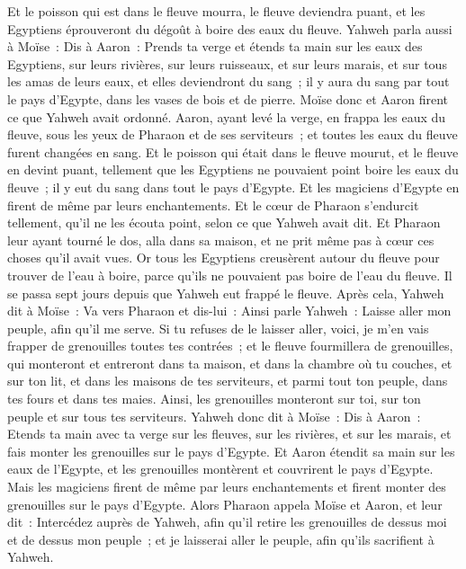 \begin{multicols}{2}
Et le poisson qui est dans le fleuve mourra, le fleuve deviendra puant, et les Egyptiens éprouveront du dégoût à boire des eaux du fleuve.
Yahweh parla aussi à Moïse~: Dis à Aaron~: Prends ta verge et étends ta main sur les eaux des Egyptiens, sur leurs rivières, sur leurs ruisseaux, et sur leurs marais, et sur tous les amas de leurs eaux, et elles deviendront du sang~; il y aura du sang par tout le pays d'Egypte, dans les vases de bois et de pierre.
Moïse donc et Aaron firent ce que Yahweh avait ordonné. Aaron, ayant levé la verge, en frappa les eaux du fleuve, sous les yeux de Pharaon et de ses serviteurs~; et toutes les eaux du fleuve furent changées en sang.
Et le poisson qui était dans le fleuve mourut, et le fleuve en devint puant, tellement que les Egyptiens ne pouvaient point boire les eaux du fleuve~; il y eut du sang dans tout le pays d'Egypte.
Et les magiciens d'Egypte en firent de même par leurs enchantements. Et le cœur de Pharaon s'endurcit tellement, qu'il ne les écouta point, selon ce que Yahweh avait dit.
Et Pharaon leur ayant tourné le dos, alla dans sa maison, et ne prit même pas à cœur ces choses qu'il avait vues.
Or tous les Egyptiens creusèrent autour du fleuve pour trouver de l'eau à boire, parce qu'ils ne pouvaient pas boire de l'eau du fleuve.
Il se passa sept jours depuis que Yahweh eut frappé le fleuve.
Après cela, Yahweh dit à Moïse~: Va vers Pharaon et dis-lui~: Ainsi parle Yahweh~: Laisse aller mon peuple, afin qu'il me serve.
Si tu refuses de le laisser aller, voici, je m'en vais frapper de grenouilles toutes tes contrées~;
et le fleuve fourmillera de grenouilles, qui monteront et entreront dans ta maison, et dans la chambre où tu couches, et sur ton lit, et dans les maisons de tes serviteurs, et parmi tout ton peuple, dans tes fours et dans tes maies.
Ainsi, les grenouilles monteront sur toi, sur ton peuple et sur tous tes serviteurs.
\VerseOne{}Yahweh donc dit à Moïse~: Dis à Aaron~: Etends ta main avec ta verge sur les fleuves, sur les rivières, et sur les marais, et fais monter les grenouilles sur le pays d'Egypte.
Et Aaron étendit sa main sur les eaux de l'Egypte, et les grenouilles montèrent et couvrirent le pays d'Egypte.
Mais les magiciens firent de même par leurs enchantements et firent monter des grenouilles sur le pays d'Egypte.
Alors Pharaon appela Moïse et Aaron, et leur dit~: Intercédez auprès de Yahweh, afin qu'il retire les grenouilles de dessus moi et de dessus mon peuple~; et je laisserai aller le peuple, afin qu'ils sacrifient à Yahweh.

\end{multicols}
